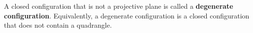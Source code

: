 A closed configuration that is not a projective plane is called a \textbf{degenerate configuration}. Equivalently, a degenerate configuration is a closed configuration that does not contain a quadrangle.
